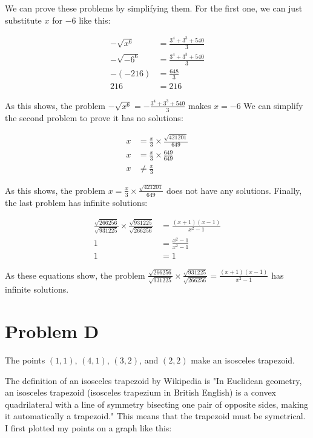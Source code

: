 \documentclass[a4paper]{article}
\begin{document}
We can prove these problems by simplifying them. For the first one, we can just substitute $x$ for $-6$ like this:

\begin{align*}
-\sqrt{x^6}&=\frac{3^4+3^3+540}{3} \\
-\sqrt{-6^6}&=\frac{3^4+3^3+540}{3} \\
-(-216)&=\frac{648}{3} \\
216&=216 
\end{align*}

As this shows, the problem $-\sqrt{x^6}=-\frac{3^4+3^3+540}{3}$ makes $x=-6$ We can simplify the second problem to prove it has no solutions:

\begin{align*}
x&=\frac{x}{3}\times \frac{\sqrt{421201}}{649} \\
x&=\frac{x}{3}\times\frac{649}{649}\\
x&\ne\frac{x}{3} 
\end{align*}

As this shows, the problem $x=\frac{x}{3}\times \frac{\sqrt{421201}}{649}$ does not have any solutions. Finally, the last problem has infinite solutions:

\begin{align*}
\frac{\sqrt{266256}}{\sqrt{931225}}\times\frac{\sqrt{931225}}{\sqrt{266256}}&=\frac{(x+1)(x-1)}{x^2-1} \\
1&=\frac{x^2-1}{x^2-1}\\
1&=1 
\end{align*}

As these equations show, the problem $\frac{\sqrt{266256}}{\sqrt{931225}}\times\frac{\sqrt{931225}}{\sqrt{266256}}=\frac{(x+1)(x-1)}{x^2-1}$ has infinite solutions.

\section{Problem D}

The points $(1,1)$, $(4,1)$, $(3,2)$, and $(2,2)$ make an isosceles trapezoid.

The definition of an isosceles trapezoid by Wikipedia is "In Euclidean geometry, an isosceles trapezoid (isosceles trapezium in British English) is a convex quadrilateral with a line of symmetry bisecting one pair of opposite sides, making it automatically a trapezoid." This means that the trapezoid must be symetrical. I first plotted my points on a graph like this: 
\end{document}
